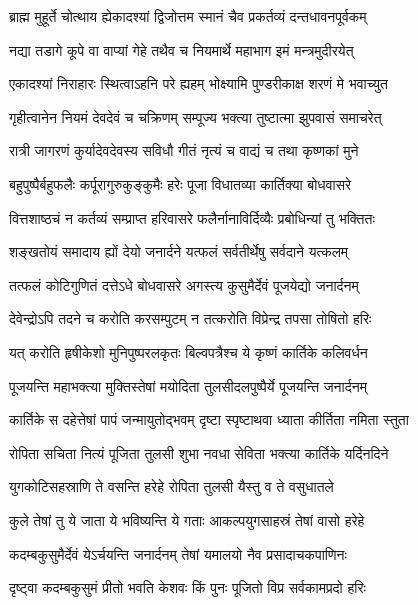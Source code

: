 
\twolineshloka
{ब्राह्म मुहूर्ते चोत्थाय ह्येकादश्यां द्विजोत्तम}
{स्मानं चैव प्रकर्तव्यं दन्तधावनपूर्वकम्} %

\twolineshloka
{नद्या तडागे कूपे वा वाप्यां गेहे तथैव च}
{नियमार्थे महाभाग इमं मन्त्रमुदीरयेत्} %

\twolineshloka
{एकादश्यां निराहारः स्थित्वाऽहनि परे ह्यहम्}
{भोक्ष्यामि पुण्डरीकाक्ष शरणं मे भवाच्युत} %

\twolineshloka
{गृहीत्वानेन नियमं देवदेवं च चक्रिणम्}
{सम्पूज्य भक्त्या तुष्टात्मा झुपवासं समाचरेत्} %

\twolineshloka
{रात्री जागरणं कुर्यादेवदेवस्य सविधौ}
{गीतं नृत्यं च वाद्यं च तथा कृष्णकां मुने} %

\twolineshloka
{बहुपुष्पैर्बहुफलैः कर्पूरागुरुकुङ्कुमैः}
{हरेः पूजा विधातव्या कार्तिक्या बोधवासरे} %

\twolineshloka
{वित्तशाष्ठचं न कर्तव्यं सम्प्राप्त हरिवासरे}
{फलैर्नानाविर्दिव्यैः प्रबोधिन्यां तु भक्तितः} %

\twolineshloka
{शङ्खतोयं समादाय ह्यों देयो जनार्दने}
{यत्फलं सर्वतीर्थेषु सर्वदाने यत्कलम्} %

\twolineshloka
{तत्फलं कोटिगुणितं दत्तेऽधे बोधवासरे}
{अगस्त्य कुसुमैर्देवं पूजयेद्यो जनार्दनम्} %

\twolineshloka
{देवेन्द्रोऽपि तदने च करोति करसम्पुटम्}
{न तत्करोति विप्रेन्द्र तपसा तोषितो हरिः} %

\twolineshloka
{यत् करोति हृषीकेशो मुनिपुष्परलकृतः}
{बिल्वपत्रैश्च ये कृष्णं कार्तिके कलिवर्धन} %

\twolineshloka
{पूजयन्ति महाभक्त्या मुक्तिस्तेषां मयोदिता}
{तुलसीदलपुष्पैर्ये पूजयन्ति जनार्दनम्} %

\twolineshloka
{कार्तिके स दहेत्तेषां पापं जन्मायुतोद्भवम्}
{दृष्टा स्पृष्टाथवा ध्याता कीर्तिता नमिता स्तुता} %

\twolineshloka
{रोपिता सचिता नित्यं पूजिता तुलसी शुभा}
{नवधा सेविता भक्त्या कार्तिके यर्दिनदिने} %

\twolineshloka
{युगकोटिसहस्राणि ते वसन्ति हरेहे}
{रोपिता तुलसी यैस्तु व ते वसुधातले} %

\twolineshloka
{कुले तेषां तु ये जाता ये भविष्यन्ति ये गताः}
{आकल्पयुगसाहस्रं तेषां वासो हरेहे} %

\twolineshloka
{कदम्बकुसुमैर्देवं येऽर्चयन्ति जनार्दनम्}
{तेषां यमालयो नैव प्रसादाचकपाणिनः} %

\twolineshloka
{दृष्ट्वा कदम्बकुसुमं प्रीतो भवति केशवः}
{किं पुनः पूजितो विप्र सर्वकामप्रदो हरिः} %

